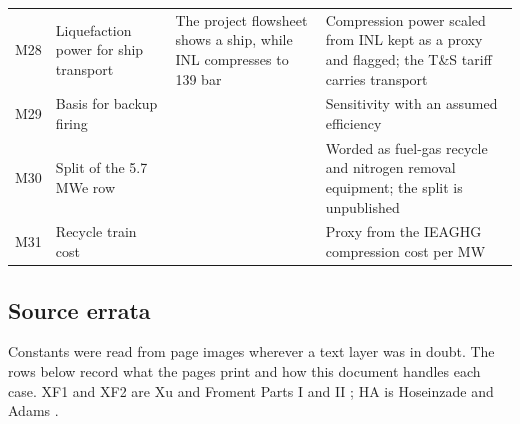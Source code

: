 \begin{longtable}{@{}>{\raggedright\arraybackslash}p{0.9cm}>{\raggedright\arraybackslash}p{3.9cm}>{\raggedright\arraybackslash}p{4.2cm}>{\raggedright\arraybackslash}p{6.6cm}@{}}
M28 & Liquefaction power for ship transport & The project flowsheet shows a ship, while INL compresses to 139 bar & Compression power scaled from INL kept as a proxy and flagged; the T\&S tariff carries transport\\
M29 & Basis for backup firing & & Sensitivity with an assumed efficiency\\
M30 & Split of the 5.7 MWe row & & Worded as fuel-gas recycle and nitrogen removal equipment; the split is unpublished\\
M31 & Recycle train cost & & Proxy from the IEAGHG compression cost per MW\\
\end{longtable}
\endgroup

\subsection*{Source errata}
Constants were read from page images wherever a text layer was in doubt. The rows below record what the pages print and how this document handles each case. XF1 and XF2 are Xu and Froment Parts I and II \cite{XF1,XF2}; HA is Hoseinzade and Adams \cite{HA}.

